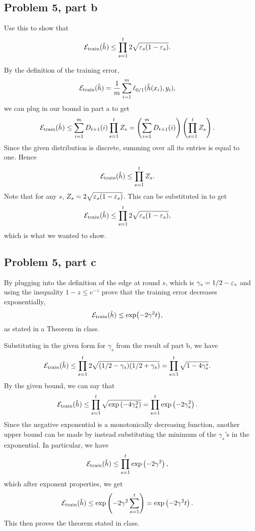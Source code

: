 \newpage
\subsection{Problem 5, part b}
Use this to show that  
\[\mathcal{E}_{\text{train}}(\hat{h}) \leq \prod_{s = 1}^t 2\sqrt{\varepsilon_s(1 - \varepsilon_s)}.\]
\partbreak
\begin{solution}

    By the definition of the training error, 
    \[\mathcal{E} _{\text{train}}(\hat{h}) = \frac{1}{m}\sum_{i = 1}^m\ell_{0/1}(\hat{h}(x_i), y_i),\]
    we can plug in our bound in part a to get
    \[\mathcal{E} _{\text{train}}(\hat{h}) \leq \sum_{i = 1}^m D_{t+1}(i)\prod_{s = 1}^tZ_s = \left(\sum_{i = 1}^m D_{t+1}(i)\right)\left(\prod_{s = 1}^tZ_s\right).\]
    Since the given distribution is discrete, summing over all its entries is equal to one. Hence 
    \[\mathcal{E} _{\text{train}}(\hat{h}) \leq \prod_{s = 1}^tZ_s.\]
    Note that for any $s$, $Z_s = 2\sqrt{\varepsilon_s(1 - \varepsilon_s)}$. This can be substituted in to get
    \[\mathcal{E} _{\text{train}}(\hat{h}) \leq \prod_{s = 1}^t2\sqrt{\varepsilon_s(1 - \varepsilon_s)},\]
    which is what we wanted to show.
\end{solution}

\newpage
\subsection{Problem 5, part c}
By plugging into the definition of the edge at round $s$, which is $\gamma_s = 1/2 - \varepsilon_s$ and using the inequality $1 - z \leq e^{-z}$ prove that the training error decreases exponentially,
\[\mathcal{E}_{\text{train}}(\hat{h}) \leq \exp(-2\gamma^2t),\]
as stated in a Theorem in class.
\partbreak
\begin{solution}
    Substituting in the given form for $\gamma_s$ from the result of part b, we have
    \[\mathcal{E} _{\text{train}}(\hat{h}) \leq \prod_{s = 1}^t2\sqrt{(1/2 - \gamma_s)(1/2 + \gamma_s)} = \prod_{s = 1}^t \sqrt{1 - 4\gamma_s^s}.\]
    By the given bound, we can say that 
    \[\mathcal{E} _{\text{train}}(\hat{h}) \leq \prod_{s = 1}^t \sqrt{\exp\left(-4\gamma_s^2\right)} = \prod_{s = 1}^t \exp\left(-2\gamma_s^2\right).\]
    Since the negative exponential is a monotonically decreasing function, another upper bound can be made by instead substituting the minimum of the $\gamma_s$'s in the exponential. In particular, we have  
    \[\mathcal{E} _{\text{train}}(\hat{h}) \leq \prod_{s = 1}^t \exp\left(-2\gamma^2\right),\]
    which after exponent properties, we get
    \[\mathcal{E} _{\text{train}}(\hat{h}) \leq \exp\left(-2\gamma^2\sum_{s = 1}^t\right) = \exp\left(-2\gamma^2t\right).\]
    This then proves the theorem stated in class. 
\end{solution}

